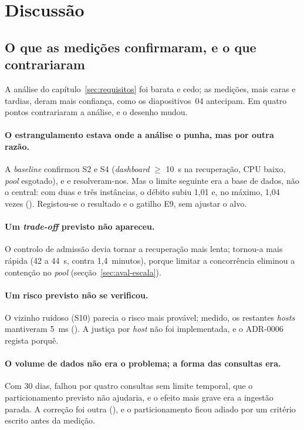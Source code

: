 \section{Discussão}
\label{sec:discussao}

\subsection{O que as medições confirmaram, e o que contrariaram}
\label{sec:tradeoffs-observados}

A análise do capítulo~\ref{sec:requisitos} foi barata e cedo; as medições, mais caras e tardias, deram mais
confiança, como os diapositivos~04 antecipam. Em quatro pontos contrariaram a análise, e o desenho mudou.

\paragraph{O estrangulamento estava onde a análise o punha, mas por outra razão.}
A \emph{baseline} confirmou S2 e S4 (\emph{dashboard} $\ge$ 10~s na recuperação, CPU baixo, \emph{pool} esgotado),
e  e  resolveram-nos. Mas o limite seguinte era a base de dados, não o central: com duas e três
instâncias, o débito subiu 1,01 e, no máximo, 1,04 vezes (). Registou-se o resultado e o gatilho E9, sem ajustar o
alvo.

\paragraph{Um \emph{trade-off} previsto não apareceu.}
O controlo de admissão devia tornar a recuperação mais lenta; tornou-a mais rápida (42 a 44~s, contra
1,4~minutos), porque limitar a concorrência eliminou a contenção no \emph{pool} (secção~\ref{sec:aval-escala}).

\paragraph{Um risco previsto não se verificou.}
O vizinho ruidoso (S10) parecia o risco mais provável; medido, os restantes \emph{hosts} mantiveram 5~ms
(). A justiça por \emph{host} não foi implementada, e o ADR-0006 regista porquê.

\paragraph{O volume de dados não era o problema; a forma das consultas era.}
Com 30 dias,  falhou por quatro consultas sem limite temporal, que o particionamento previsto não ajudaria,
e o efeito mais grave era a ingestão parada. A correção foi outra (), e o particionamento ficou adiado por um
critério escrito antes da medição.

